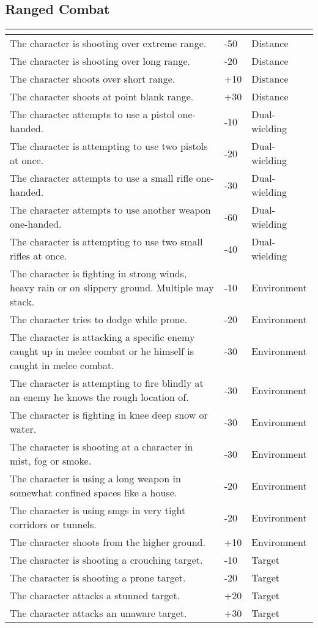 \documentclass[12pt,a4paper,openany]{book}
\newcommand{\ul}[1]{\underline{\smash{#1}}}
\begin{document}
	\subsection{Ranged Combat}
	\begin{tabularx}{\textwidth}{|X|l|l|}
		\hline
		\ul{Situation} & \ul{Modifier} & \ul{Keyword} \\ \hline
		The character is shooting over extreme range. & -50 & Distance \\ \hline
		The character is shooting over long range. & -20 & Distance \\ \hline
		The character shoots over short range. & +10 & Distance \\ \hline
		The character shoots at point blank range. & +30 & Distance \\ \hline
		The character attempts to use a pistol one-handed. & -10 & Dual-wielding \\ \hline
		The character is attempting to use two pistols at once. & -20 & Dual-wielding \\ \hline
		The character attempts to use a small rifle one-handed. & -30 & Dual-wielding \\ \hline
		The character attempts to use another weapon one-handed. & -60 & Dual-wielding \\ \hline
		The character is attempting to use two small rifles at once. & -40 & Dual-wielding \\ \hline
		The character is fighting in strong winds, heavy rain or on slippery ground. Multiple may stack. & -10 & Environment \\ \hline
		The character tries to dodge while prone. & -20 & Environment \\ \hline
		The character is attacking a specific enemy caught up in melee combat or he himself is caught in melee combat. & -30 & Environment \\ \hline
		The character is attempting to fire blindly at an enemy he knows the rough location of. & -30 & Environment \\ \hline
		The character is fighting in knee deep snow or water. & -30 & Environment \\ \hline
		The character is shooting at a character in mist, fog or smoke. & -30 & Environment \\ \hline
		The character is using a long weapon in somewhat confined spaces like a house. & -20 & Environment \\ \hline
		The character is using smgs in very tight corridors or tunnels. & -20 & Environment \\ \hline
		The character shoots from the higher ground. & +10 & Environment \\ \hline
		The character is shooting a crouching target. & -10 & Target \\ \hline
		The character is shooting a prone target. & -20 & Target \\ \hline
		The character attacks a stunned target. & +20 & Target \\ \hline
		The character attacks an unaware target. & +30 & Target \\ \hline
	\end{tabularx}
\end{document}
